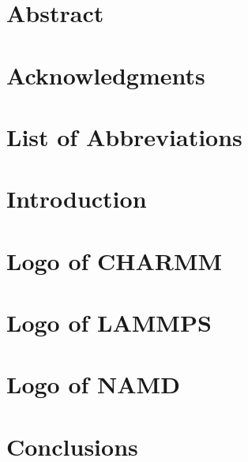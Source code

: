 \documentclass[12pt, twoside]{book}
\begin{document}

\newpage\null\thispagestyle{empty}\newpage

\chapter*{Abstract}


\chapter*{Acknowledgments}


\pagestyle{plain}
\tableofcontents
\listoffigures
\listoftables
{}
\chapter*{List of Abbreviations}



\chapter{Introduction}
\setlength{\parskip}{0em}


\chapter{Logo of CHARMM}


\chapter{Logo of LAMMPS}


\chapter{Logo of NAMD}


\chapter{Conclusions}


\cleardoublepage
{}
{}
 
\end{document}

